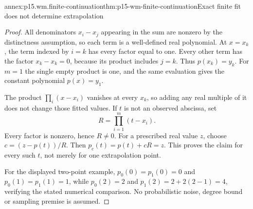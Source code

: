 \begin{annexitem}{annex:p15.wm.finite-continuation}{thm:p15-wm-finite-continuation}{Exact finite fit does not determine extrapolation}
\begin{proof}
All denominators \(x_i-x_j\) appearing in the sum are nonzero by the
distinctness assumption, so each term is a well-defined real polynomial.
At \(x=x_k\), the term indexed by \(i=k\) has every factor equal to one.
Every other term has the factor \(x_k-x_k=0\), because its product includes
\(j=k\). Thus \(p(x_k)=y_k\). For \(m=1\) the single empty product is one,
and the same evaluation gives the constant polynomial \(p(x)=y_1\).

The product \(\prod_i(x-x_i)\) vanishes at every \(x_k\), so adding
any real multiple of it does not change those fitted values.
If \(t\) is not an observed abscissa, set
\[
 R=\prod_{i=1}^m(t-x_i).
\]
Every factor is nonzero, hence \(R\ne0\).
For a prescribed real value \(z\), choose \(c=(z-p(t))/R\).
Then \(p_c(t)=p(t)+cR=z\). This proves the claim for every such \(t\),
not merely for one extrapolation point.

For the displayed two-point example, \(p_0(0)=p_1(0)=0\) and
\(p_0(1)=p_1(1)=1\), while \(p_0(2)=2\) and
\(p_1(2)=2+2(2-1)=4\), verifying the stated numerical comparison.
No probabilistic noise, degree bound or sampling premise is assumed.
\end{proof}
\end{annexitem}
